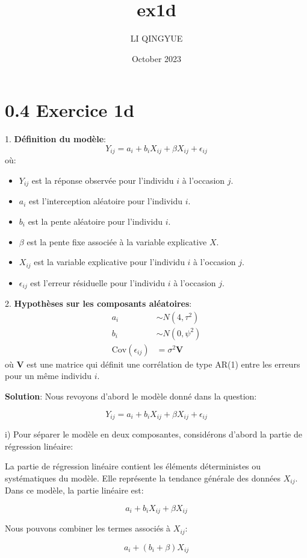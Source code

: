 \documentclass{article}
\title{ex1d}
\author{LI QINGYUE}
\date{October 2023}
\begin{document}
\section*{0.4 Exercice 1d}

1. \textbf{Définition du modèle}:
\[ Y_{ij} = a_i + b_i X_{ij} + \beta X_{ij} + \epsilon_{ij} \]
où:
\begin{itemize}
    \item \( Y_{ij} \) est la réponse observée pour l'individu \( i \) à l'occasion \( j \).
    \item \( a_i \) est l'interception aléatoire pour l'individu \( i \).
    \item \( b_i \) est la pente aléatoire pour l'individu \( i \).
    \item \( \beta \) est la pente fixe associée à la variable explicative \( X \).
    \item \( X_{ij} \) est la variable explicative pour l'individu \( i \) à l'occasion \( j \).
    \item \( \epsilon_{ij} \) est l'erreur résiduelle pour l'individu \( i \) à l'occasion \( j \).
\end{itemize}

2. \textbf{Hypothèses sur les composants aléatoires}:
\begin{align*}
    a_i &\sim N(4, \tau^2) \\
    b_i &\sim N(0, \psi^2) \\
    \text{Cov}(\epsilon_{ij}) &= \sigma^2 \bm{V}
\end{align*}
où \( \bm{V} \) est une matrice qui définit une corrélation de type AR(1) entre les erreurs pour un même individu \( i \).

\textbf{Solution}:
Nous revoyons d'abord le modèle donné dans la question:

\[
Y_{ij} = a_i + b_i X_{ij} + \beta X_{ij} + \epsilon_{ij}
\]

i) Pour séparer le modèle en deux composantes, considérons d'abord la partie de régression linéaire:

La partie de régression linéaire contient les éléments déterministes ou systématiques du modèle. Elle représente la tendance générale des données \(X_{ij}\). Dans ce modèle, la partie linéaire est:

\[
a_i + b_i X_{ij} + \beta X_{ij}
\]

Nous pouvons combiner les termes associés à \(X_{ij}\):

\[
a_i + (b_i + \beta) X_{ij}
\]
\end{document}
